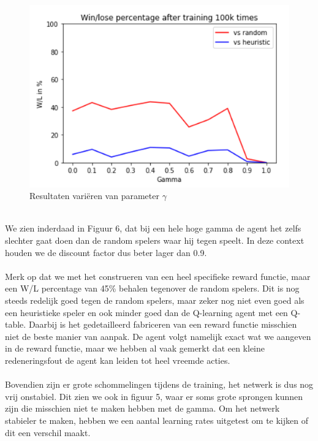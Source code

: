 \documentclass[11pt]{article}
\begin{document}
\begin{figure}[h]
\centering
\includegraphics[scale=0.45]{images/gamma-iteratie-dqn.png}
\caption{Resultaten variëren van parameter $\gamma$}
\end{figure}\\
We zien inderdaad in Figuur 6, dat bij een hele hoge gamma de agent het zelfs slechter gaat doen dan de random spelers waar hij tegen speelt. In deze context houden we de discount factor dus beter lager dan 0.9.\\\\
Merk op dat we met het construeren van een heel specifieke reward functie, maar een W/L percentage van 45\% behalen tegenover de random spelers. Dit is nog steeds redelijk goed tegen de random spelers, maar zeker nog niet even goed als een heuristieke speler en ook minder goed dan de Q-learning agent met een Q-table. Daarbij is het gedetailleerd fabriceren van een reward functie misschien niet de beste manier van aanpak. De agent volgt namelijk exact wat we aangeven in de reward functie, maar we hebben al vaak gemerkt dat een kleine redeneringsfout de agent kan leiden tot heel vreemde acties.\\\\
Bovendien zijn er grote schommelingen tijdens de training, het netwerk is dus nog vrij onstabiel. Dit zien we ook in figuur 5, waar er soms grote sprongen kunnen zijn die misschien niet te maken hebben met de gamma. Om het netwerk stabieler te maken, hebben we een aantal learning rates uitgetest om te kijken of dit een verschil maakt.\\
\end{document}
